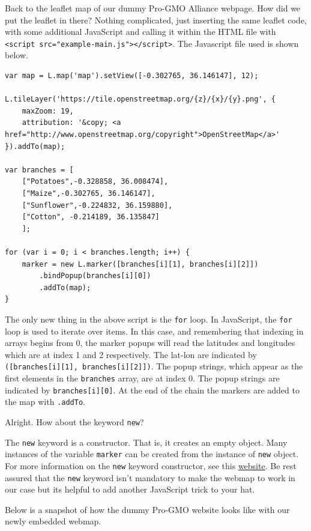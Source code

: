 \documentclass[
]{book}
\begin{document}
Back to the leaflet map of our dummy Pro-GMO Alliance webpage. How did we put the leaflet in there? Nothing complicated, just inserting the same leaflet code, with some additional JavaScript and calling it within the HTML file with \texttt{\textless{}script\ src="example-main.js"\textgreater{}\textless{}/script\textgreater{}}. The Javascript file used is shown below.

\begin{verbatim}
var map = L.map('map').setView([-0.302765, 36.146147], 12);

L.tileLayer('https://tile.openstreetmap.org/{z}/{x}/{y}.png', {
    maxZoom: 19,
    attribution: '&copy; <a href="http://www.openstreetmap.org/copyright">OpenStreetMap</a>'
}).addTo(map);

var branches = [
    ["Potatoes",-0.328858, 36.008474],
    ["Maize",-0.302765, 36.146147],
    ["Sunflower",-0.224832, 36.159880],
    ["Cotton", -0.214189, 36.135847]
    ];

for (var i = 0; i < branches.length; i++) {
    marker = new L.marker([branches[i][1], branches[i][2]])
        .bindPopup(branches[i][0])
        .addTo(map);
}
\end{verbatim}

The only new thing in the above script is the \texttt{for} loop. In JavaScript, the \texttt{for} loop is used to iterate over items. In this case, and remembering that indexing in arrays begins from 0, the marker popups will read the latitudes and longitudes which are at index 1 and 2 respectively. The lat-lon are indicated by \texttt{({[}branches{[}i{]}{[}1{]},\ branches{[}i{]}{[}2{]}{]})}. The popup strings, which appear as the first elements in the \texttt{branches} array, are at index 0. The popup strings are indicated by \texttt{branches{[}i{]}{[}0{]}}. At the end of the chain the markers are added to the map with \texttt{.addTo}.

Alright. How about the keyword \texttt{new}?

The \texttt{new} keyword is a constructor. That is, it creates an empty object. Many instances of the variable \texttt{marker} can be created from the instance of \texttt{new} object. For more information on the \texttt{new} keyword constructor, see this \href{https://www.programiz.com/javascript/constructor-function}{website}. Be rest assured that the \texttt{new} keyword isn't mandatory to make the webmap to work in our case but its helpful to add another JavaScript trick to your hat.

Below is a snapshot of how the dummy Pro-GMO website looks like with our newly embedded webmap.
\end{document}
